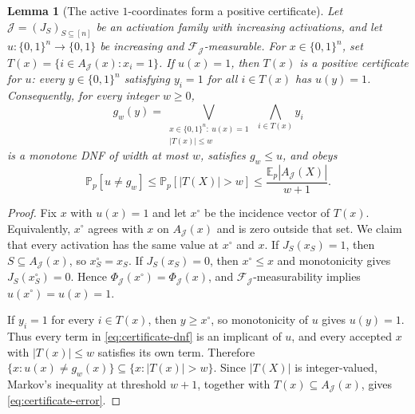 \documentclass[11pt,letterpaper]{article}
\newtheorem{lemma}[theorem]{Lemma}
\theoremstyle{definition}
\theoremstyle{remark}
\newcommand{\bits}{\{0,1\}}
\newcommand{\E}{\mathbb E}
\renewcommand{\Pr}{\mathbb P}
\newcommand{\cF}{\mathcal F}
\newcommand{\cJ}{\mathcal J}
\begin{document}
\begin{lemma}[The active $1$-coordinates form a positive certificate]
\label{lem:certificates}
Let $\cJ=(J_S)_{S\subseteq[n]}$ be an activation family with increasing
activations, and let $u:\bits^n\to\bits$ be increasing and
$\cF_{\cJ}$-measurable.  For $x\in\bits^n$, set
$T(x)=\{i\in A_{\cJ}(x):x_i=1\}$.  If $u(x)=1$, then $T(x)$ is a positive certificate for $u$: every
$y\in\bits^n$ satisfying $y_i=1$ for all $i\in T(x)$ has $u(y)=1$.
Consequently, for every integer $w\ge0$,
\begin{equation}
\label{eq:certificate-dnf}
  g_w(y)=
  \bigvee_{\substack{x\in\bits^n:\ u(x)=1\\ |T(x)|\le w}}
  \ \bigwedge_{i\in T(x)}y_i
\end{equation}
is a monotone DNF of width at most $w$, satisfies $g_w\le u$, and obeys
\begin{equation}
\label{eq:certificate-error}
  \Pr_p[u\ne g_w]
  \le\Pr_p[|T(X)|>w]
  \le\frac{\E_p|A_{\cJ}(X)|}{w+1}.
\end{equation}
\end{lemma}

\begin{proof}
Fix $x$ with $u(x)=1$ and let $x^\circ$ be the incidence vector of $T(x)$.
Equivalently, $x^\circ$ agrees with $x$ on $A_{\cJ}(x)$ and is zero outside
that set.  We claim that every activation has the same value at $x^\circ$ and
$x$.  If $J_S(x_S)=1$, then $S\subseteq A_{\cJ}(x)$, so
$x_S^\circ=x_S$.  If $J_S(x_S)=0$, then $x^\circ\le x$ and monotonicity gives
$J_S(x_S^\circ)=0$.  Hence
$\Phi_{\cJ}(x^\circ)=\Phi_{\cJ}(x)$, and
$\cF_{\cJ}$-measurability implies $u(x^\circ)=u(x)=1$.

If $y_i=1$ for every $i\in T(x)$, then $y\ge x^\circ$, so monotonicity of $u$
gives $u(y)=1$.  Thus every term in \eqref{eq:certificate-dnf} is an implicant
of $u$, and every accepted $x$ with $|T(x)|\le w$ satisfies its own term.
Therefore
$\{x:u(x)\ne g_w(x)\}\subseteq\{x:|T(x)|>w\}$.  Since $|T(X)|$ is
integer-valued, Markov's inequality at threshold $w+1$, together with
$T(x)\subseteq A_{\cJ}(x)$, gives \eqref{eq:certificate-error}.
\end{proof}
\end{document}
